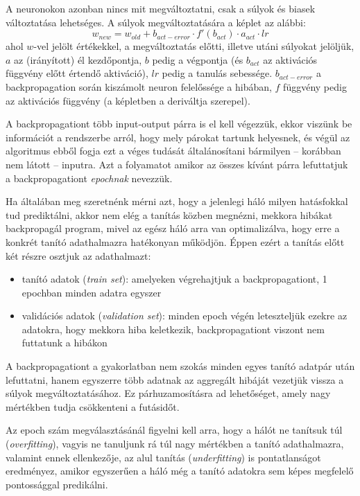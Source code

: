 A neuronokon azonban nincs mit megváltoztatni, csak a súlyok és biasek változtatása lehetséges. A súlyok megváltoztatására a képlet az alábbi:
$$ w_{new} =  w_{old} + b_{act-error} \cdot f'(b_{act}) \cdot a_{act} \cdot lr $$
ahol $w$-vel jelölt értékekkel, a megváltoztatás előtti, illetve utáni súlyokat jelöljük, $a$ az (irányított) él kezdőpontja, $b$ pedig a végpontja (és $b_{act}$ az aktivációs függvény előtt értendő aktiváció), $lr$ pedig a tanulás sebessége. $b_{act-error}$ a backpropagation során kiszámolt neuron felelőssége a hibában, $f$ függvény pedig az aktivációs függvény (a képletben a deriváltja szerepel). 

A backpropagationt több input-output párra is el kell végezzük, ekkor viszünk be információt a rendszerbe arról, hogy mely párokat tartunk helyesnek, és végül az algoritmus ebből fogja ezt a véges tudását általánosítani bármilyen -- korábban nem látott -- inputra. Azt a folyamatot amikor az összes kívánt párra lefuttatjuk a backpropagationt \emph{epochnak} nevezzük. 

Ha általában meg szeretnénk mérni azt, hogy a jelenlegi háló milyen hatásfokkal tud prediktálni, akkor nem elég a tanítás közben megnézni, mekkora hibákat backpropagál program, mivel az egész háló arra van optimalizálva, hogy erre a konkrét tanító adathalmazra hatékonyan működjön. Éppen ezért a tanítás előtt két részre osztjuk az adathalmazt:

\begin{itemize}  
	\item tanító adatok (\emph{train set}): amelyeken végrehajtjuk a backpropagationt, 1 epochban minden adatra egyszer
	\item validációs adatok (\emph{validation set}): minden epoch végén leteszteljük ezekre az adatokra, hogy mekkora hiba keletkezik, backpropagationt viszont nem futtatunk a hibákon
\end{itemize}

A backpropagationt a gyakorlatban nem szokás minden egyes tanító adatpár után lefuttatni, hanem egyszerre több adatnak az aggregált hibáját vezetjük vissza a súlyok megváltoztatásához. Ez párhuzamosításra ad lehetőséget, amely nagy mértékben tudja csökkenteni a futásidőt.

Az epoch szám megválasztásánál figyelni kell arra, hogy a hálót ne tanítsuk túl (\emph{overfitting}), vagyis ne tanuljunk rá túl nagy mértékben a tanító adathalmazra, valamint ennek ellenkezője, az alul tanítás (\emph{underfitting}) is pontatlanságot eredményez, amikor egyszerűen a háló még a tanító adatokra sem képes megfelelő pontossággal predikálni.


